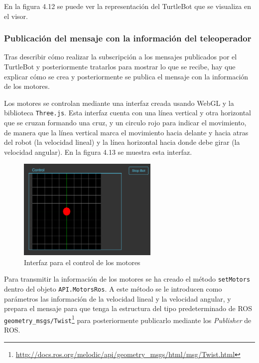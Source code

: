 En la figura 4.12 se puede ver la representación del TurtleBot que se visualiza en el visor.

\subsubsection{Publicación del mensaje con la información del teleoperador}

Tras describir cómo realizar la subscripción a los mensajes publicados por el TurtleBot y posteriormente tratarlos para mostrar lo que se recibe, hay que explicar cómo se crea y posteriormente se publica el mensaje con la información de los motores.

Los motores se controlan mediante una interfaz creada usando WebGL y la biblioteca \texttt{Three.js}. Esta interfaz cuenta con una línea vertical y otra horizontal que se cruzan formando una cruz, y un circulo rojo para indicar el movimiento, de manera que la línea vertical marca el movimiento hacia delante y hacia atras del robot (la velocidad lineal) y la línea horizontal hacia donde debe girar (la velocidad angular). En la figura 4.13 se muestra esta interfaz.

\begin{figure}[H]
  \begin{center}
    \includegraphics[width=0.6\textwidth]{figures/controlturtle.png}
		\caption{Interfaz para el control de los motores}
		\label{fig.controlturtle}
		\end{center}
\end{figure}

Para transmitir la información de los motores se ha creado el método \texttt{setMotors} dentro del objeto \texttt{API.MotorsRos}. A este método se le introducen como parámetros las información de la velocidad lineal y la velocidad angular, y prepara el mensaje para que tenga la estructura del tipo predeterminado de ROS \texttt{geometry\_msgs/Twist}\footnote{\url{http://docs.ros.org/melodic/api/geometry_msgs/html/msg/Twist.html}} para posteriormente publicarlo mediante los \textit{Publisher} de ROS.

